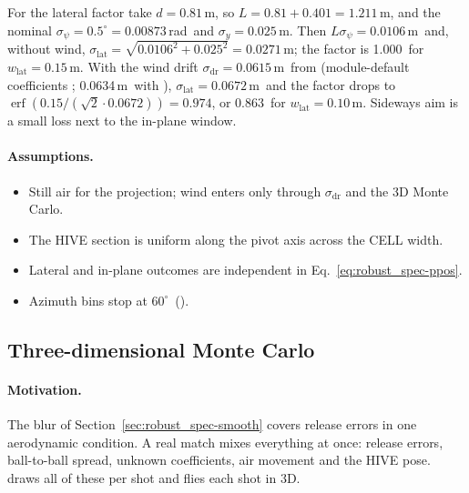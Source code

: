 For the lateral factor take $d=0.81$\,\unit{m}\assumed, so $L=0.81+0.401=1.211$\,\unit{m}\derived, and the
nominal $\sigma_\psi=0.5^\circ=0.00873$\,\unit{rad}\assumed\ and $\sigma_y=0.025$\,\unit{m}\assumed.
Then $L\sigma_\psi=0.0106$\,\unit{m}\derived\ and, without wind,
$\sigma_{\mathrm{lat}}=\sqrt{0.0106^2+0.025^2}=0.0271$\,\unit{m}\derived; the factor is
1.000\derived\ for $w_{\mathrm{lat}}=0.15$\,\unit{m}\assumed.
With the wind drift $\sigma_{\mathrm{dr}}=0.0615$\,\unit{m}\derived\ from 
(module-default coefficients ; 0.0634\,\unit{m}\derived\ with
),
$\sigma_{\mathrm{lat}}=0.0672$\,\unit{m}\derived\ and the factor drops to
$\operatorname{erf}(0.15/(\sqrt2\cdot0.0672))=0.974$\derived, or 0.863\derived\ for
$w_{\mathrm{lat}}=0.10$\,\unit{m}\assumed.
Sideways aim is a small loss next to the in-plane window.

\paragraph{Assumptions.}
\begin{itemize}
  \item Still air for the projection; wind enters only through $\sigma_{\mathrm{dr}}$ and the 3D Monte Carlo.
  \item The HIVE section is uniform along the pivot axis across the CELL width.
  \item Lateral and in-plane outcomes are independent in Eq.~\eqref{eq:robust_spec-ppos}.
  \item Azimuth bins stop at $60^\circ$\assumed\ ().
\end{itemize}

\subsection{Three-dimensional Monte Carlo}
\label{sec:robust_spec-mc}

\paragraph{Motivation.}
The blur of Section~\ref{sec:robust_spec-smooth} covers release errors in one aerodynamic condition.
A real match mixes everything at once: release errors, ball-to-ball spread, unknown coefficients,
air movement and the HIVE pose.
 draws all of these per shot and flies each shot in 3D.

